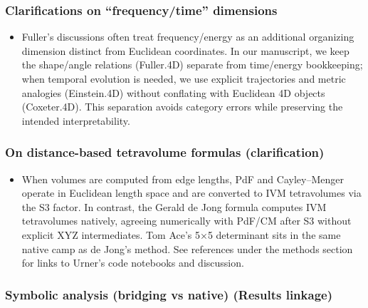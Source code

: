 \documentclass[
  10pt,
]{article}
\providecommand{\tightlist}{%
  \setlength{\itemsep}{0pt}\setlength{\parskip}{0pt}}
\begin{document}
\hypertarget{clarifications-on-frequencytime-dimensions}{%
\subsubsection{Clarifications on ``frequency/time''
dimensions}\label{clarifications-on-frequencytime-dimensions}}

\begin{itemize}
\tightlist
\item
  Fuller's discussions often treat frequency/energy as an additional
  organizing dimension distinct from Euclidean coordinates. In our
  manuscript, we keep the shape/angle relations (Fuller.4D) separate
  from time/energy bookkeeping; when temporal evolution is needed, we
  use explicit trajectories and metric analogies (Einstein.4D) without
  conflating with Euclidean 4D objects (Coxeter.4D). This separation
  avoids category errors while preserving the intended interpretability.
\end{itemize}

\hypertarget{on-distance-based-tetravolume-formulas-clarification}{%
\subsubsection{On distance-based tetravolume formulas
(clarification)}\label{on-distance-based-tetravolume-formulas-clarification}}

\begin{itemize}
\tightlist
\item
  When volumes are computed from edge lengths, PdF and Cayley--Menger
  operate in Euclidean length space and are converted to IVM
  tetravolumes via the S3 factor. In contrast, the Gerald de Jong
  formula computes IVM tetravolumes natively, agreeing numerically with
  PdF/CM after S3 without explicit XYZ intermediates. Tom Ace's 5×5
  determinant sits in the same native camp as de Jong's method. See
  references under the methods section for links to Urner's code
  notebooks and discussion.
\end{itemize}

\hypertarget{symbolic-analysis-bridging-vs-native-results-linkage}{%
\subsubsection{Symbolic analysis (bridging vs native) (Results
linkage)}\label{symbolic-analysis-bridging-vs-native-results-linkage}}
\end{document}
